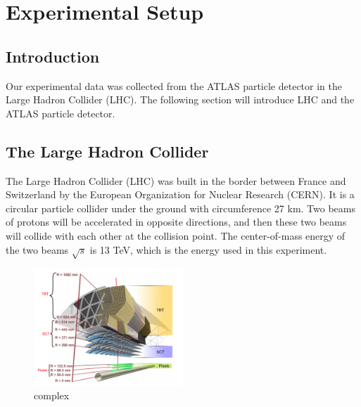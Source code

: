 \chapter{Experimental Setup}
\label{ch:detector}

\section{Introduction}
\label{sec:detector_introduction}

Our experimental data was collected from the ATLAS particle detector in the Large Hadron Collider (LHC).
The following section will introduce LHC and the ATLAS particle detector.

\section{The Large Hadron Collider}
\label{sec:detector_LHC}

The Large Hadron Collider (LHC) was built in the border between France and Switzerland by the European Organization for Nuclear Research (CERN).
It is a circular particle collider under the ground with circumference 27 km.
Two beams of protons will be accelerated in opposite directions, and then these two beams will collide with each other at the collision point. The center-of-mass energy of the two beams $\sqrt{s}$ is 13 TeV, which is the energy used in this experiment.
\cite{complex}

\begin{figure}
\centering
\includegraphics[width=0.5\textwidth]{data/photo/inner detector.png}
\caption{complex}
\label{fig:detector_LHC_accelerator_complex}
\end{figure}
